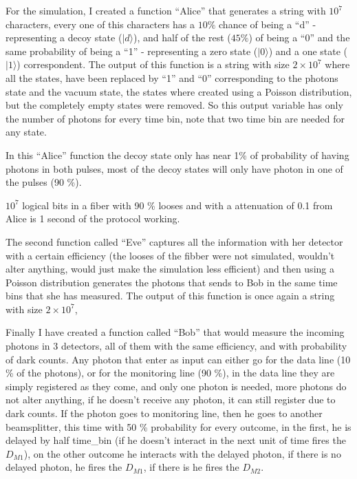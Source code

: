 \begin{refsection}
For the simulation, I created a function ``Alice'' that generates a string with $10^7$ characters, every one of this characters has a $10 \%$ chance of being a ``d'' - representing a decoy state ($|d\rangle$), and half of the rest ($45 \%$) of being a ``0'' and the same probability of being a ``1'' - representing a zero state ($|0\rangle$) and a one state ($|1\rangle$) correspondent. The output of this function is a string with size $2\times10^7$ where all the states, have been replaced by ``1'' and ``0'' corresponding to the photons state and the vacuum state, the states where created using a Poisson distribution, but the completely empty states were removed. So this output variable has only the number of photons for every time bin, note that two time bin are needed for any state.

In this ``Alice'' function the decoy state only has near 1\% of probability of having photons in both pulses, most of the decoy states will only have photon in one of the pulses (90 \%).

$10^7$ logical bits in a fiber with 90 \% looses and with a attenuation of 0.1 from Alice is 1 second of the protocol working.

The second function called ``Eve'' captures all the information with her detector with a certain efficiency (the looses of the fibber were not simulated, wouldn't alter anything, would just make the simulation less efficient)  and then using a Poisson distribution generates the photons that sends to Bob in the same time bins that she has measured. The output of this function is once again a string with size $2\times10^7$, 

Finally I have created a function called ``Bob'' that would measure the incoming photons in 3 detectors, all of them with the same efficiency, and with probability of dark counts. Any photon that enter as input can either go for the data line (10 \% of the photons), or for the monitoring line (90 \%), in the data line they are simply registered as they come, and only one photon is needed, more photons do not alter anything, if he doesn't receive any photon, it can still register due to dark counts. If the photon goes to monitoring line, then he goes to another beamsplitter, this time with 50 \% probability for every outcome, in the first, he is delayed by half time_bin (if he doesn't interact in the next unit of time fires the $D_{M1}$), on the other outcome he interacts with the delayed photon, if there is no delayed photon, he fires the $D_{M1}$, if there is he fires the $D_{M2}$.


\end{refsection}
